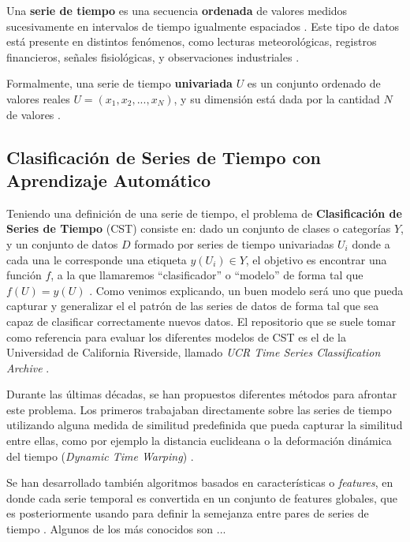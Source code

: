 \documentclass[../../main.tex]{subfiles}
\begin{document}
Una \textbf{serie de tiempo} es una secuencia \textbf{ordenada} de valores medidos
sucesivamente en intervalos de tiempo igualmente espaciados
\cite{khan2021-bilstm-for-unitsc}. Este tipo de datos está presente en distintos
fenómenos, como lecturas meteorológicas, registros financieros, señales fisiológicas, y
observaciones industriales \cite{wang2016timeseriesclassificationscratch}.

Formalmente, una serie de tiempo \textbf{univariada} \(U\) es un conjunto ordenado de
valores reales \(U = (x_1, x_2, ..., x_N)\), y su dimensión está dada por la cantidad \(N\)
de valores \cite{khan2021-bilstm-for-unitsc}.

\subsection{Clasificación de Series de Tiempo con Aprendizaje Automático}
Teniendo una definición de una serie de tiempo, el problema de \textbf{Clasificación de
Series de Tiempo} (CST) consiste en: dado un conjunto de clases o categorías \(Y\), y un
conjunto de datos \(D\) formado por series de tiempo univariadas \(U_i\) donde a cada una
le corresponde una etiqueta \(y(U_i) \in Y\), el objetivo es encontrar una función \(f\),
a la que llamaremos ``clasificador'' o ``modelo'' de forma tal que \(f(U) = y(U)\)
\cite{khan2021-bilstm-for-unitsc}. Como venimos explicando, un buen modelo será uno que
pueda capturar y generalizar el el patrón de las series de datos de forma tal que sea
capaz de clasificar correctamente nuevos datos. El repositorio que se suele tomar como
referencia para evaluar los diferentes modelos de CST es el de la Universidad de
California Riverside, llamado \textit{UCR Time Series Classification Archive}
\cite{UCRArchive2018}.

Durante las últimas décadas, se han propuestos diferentes métodos para afrontar este
problema. Los primeros trabajaban directamente sobre las series de tiempo utilizando
alguna medida de similitud predefinida que pueda capturar la similitud entre ellas, como
por ejemplo la distancia euclideana o la deformación dinámica del tiempo (\textit{Dynamic
Time Warping}) \cite{wang2016timeseriesclassificationscratch}.

Se han desarrollado también algoritmos basados en características o \textit{features}, en
donde cada serie temporal es convertida en un conjunto de features globales, que es
posteriormente usando para definir la semejanza entre pares de series de tiempo
\cite{khan2021-bilstm-for-unitsc}. Algunos de los más conocidos son ...
\end{document}
